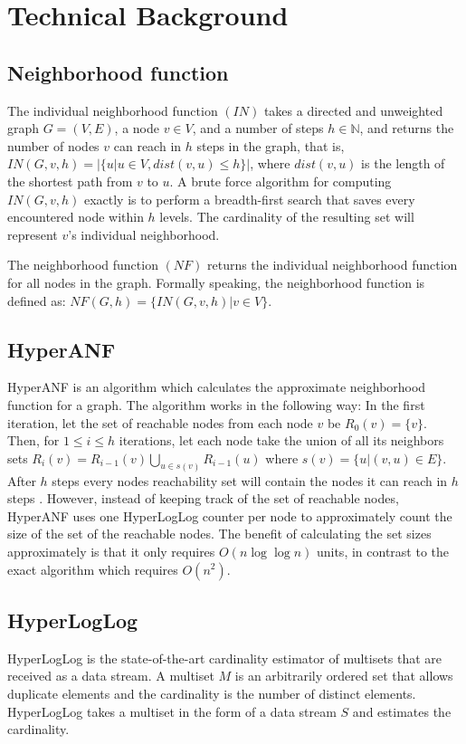 \chapter{Technical Background}

\section{Neighborhood function}
The individual neighborhood function $(IN)$ takes a directed and unweighted graph $G = (V,E)$, a node $v \in V$, and a number of steps $h \in \mathbb{N}$, and returns the number of nodes $v$ can reach in $h$ steps in the graph, that is, $IN(G,v,h) = |\{u | u \in V, dist(v,u) \leq h\}|$, where $dist(v,u)$ is the length of the shortest path from $v$ to $u$. A brute force algorithm for computing $IN(G,v,h)$ exactly is to perform a breadth-first search that saves every encountered node within $h$ levels. The cardinality of the resulting set will represent $v$'s individual neighborhood.

The neighborhood function $(NF)$ returns the individual neighborhood function for all nodes in the graph. Formally speaking, the neighborhood function is defined as: $NF(G,h) = \{ IN(G,v,h) | v \in V \}$.

\section{HyperANF}
HyperANF is an algorithm which calculates the approximate neighborhood function for a graph. The algorithm works in the following way: In the first iteration, let the set of reachable nodes from each node $v$ be $R_0(v) = \{v\}$. Then, for $1 \leq i \leq h$ iterations, let each node take the union of all its neighbors sets $R_i(v) = R_{i-1}(v) \bigcup\limits_{u \in s(v)} R_{i-1}(u) $ where $s(v) = \{u | (v,u) \in E\}$. After $h$ steps every nodes reachability set will contain the nodes it can reach in $h$ steps \cite{hyperball}. However, instead of keeping track of the set of reachable nodes, HyperANF uses one HyperLogLog counter per node to approximately count the size of the set of the reachable nodes. The benefit of calculating the set sizes approximately is that it only requires $O(n\log\log n)$ units, in contrast to the exact algorithm which requires $O(n^2)$.

\section{HyperLogLog}
HyperLogLog \cite{hyperloglog} is the state-of-the-art cardinality estimator of multisets that are received as a data stream. A multiset $M$ is an arbitrarily ordered set that allows duplicate elements and the cardinality is the number of distinct elements. HyperLogLog takes a multiset in the form of a data stream $S$ and estimates the cardinality.

